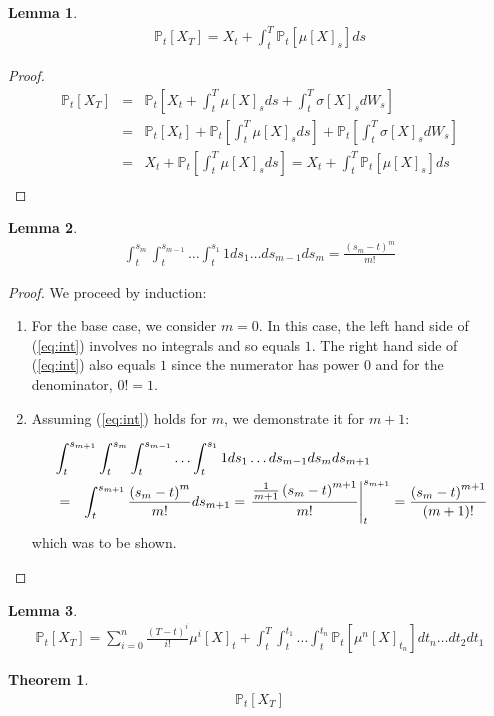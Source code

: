 \documentclass{article}
\newtheorem{thm}{Theorem}
\newtheorem{lem}{Lemma}
\newcommand{\bra}[1]{\left[#1\right]}
\renewcommand{\P}[1]{\mathbb{P}_t\bra{#1}}
\newcommand{\mub}[1]{\mu\bra{#1}}
\newcommand{\mun}[2]{\mu^{#1}\bra{#2}}
\newcommand{\sigmab}[1]{\sigma\bra{#1}}
\begin{document}
\begin{lem}
  \begin{eqnarray*}
    \P{X_T} = X_t + \int_t^T\P{\mub{X}_s}ds
  \end{eqnarray*}
\end{lem}
\begin{proof}
  \begin{eqnarray*}
    \P{X_T} & = & \P{X_t + \int_t^T \mub{X}_s ds + \int_t^T\sigmab{X}_s dW_s}\\
    & = & \P{X_t} + \P{\int_t^T \mub{X}_s ds} + \P{\int_t^T\sigmab{X}_s dW_s}\\
    & = & X_t + \P{\int_t^T \mub{X}_s ds} = X_t + \int_t^T \P{\mub{X}_s} ds\\
  \end{eqnarray*}
\end{proof}

\begin{lem}
  \begin{eqnarray}
    \int_t^{s_m} \int_t^{s_{m-1}} \ldots \int_t^{s_1} 1 ds_1 \ldots ds_{m-1} ds_m = \frac{\left(s_m - t\right)^m}{m!}\label{eq:int}
  \end{eqnarray}
\end{lem}
\begin{proof}
  We proceed by induction:

  \begin{enumerate}
  \item
    For the base case, we consider $m=0$.
    In this case, the left hand side of (\ref{eq:int}) involves no integrals and so equals $1$.
    The right hand side of (\ref{eq:int}) also equals $1$ since the numerator has power $0$ and for the denominator, $0! = 1$.

  \item
    Assuming (\ref{eq:int}) holds for $m$, we demonstrate it for $m+1$:

    \begin{eqnarray*}
      \lefteqn{\int_t^{s_{m+1}} \int_t^{s_m} \int_t^{s_{m-1}} \ldots \int_t^{s_1} 1 ds_1 \ldots ds_{m-1} ds_m ds_{m+1}}\\
      & = & \int_t^{s_{m+1}} \frac{\left(s_m - t\right)^m}{m!} ds_{m+1} = \left.\frac{\frac{1}{m+1} \left(s_m - t\right)^{m+1}}{m!}\right|_t^{s_{m+1}} = \frac{\left(s_m - t\right)^{m+1}}{(m+1)!}
    \end{eqnarray*}
    which was to be shown.
  \end{enumerate}
\end{proof}

\begin{lem}
  \begin{eqnarray*}
    \P{X_T} = \sum_{i=0}^n \frac{\left(T - t\right)^i}{i!} \mun{i}{X}_t + \int_t^T \int_t^{t_1} \ldots \int_t^{t_n} \P{\mun{n}{X}_{t_n}} dt_n \ldots dt_2 dt_1
  \end{eqnarray*}
\end{lem}

\begin{thm}
  \begin{eqnarray*}
    \P{X_T}
  \end{eqnarray*}
\end{thm}
\end{document}
